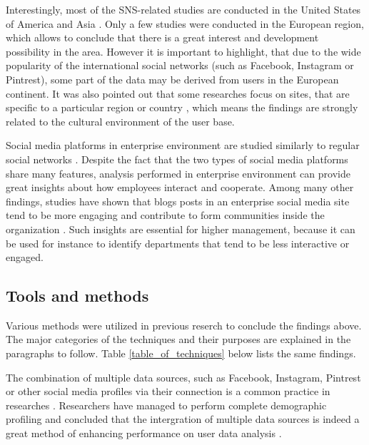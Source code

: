 Interestingly, most of the SNS-related studies are conducted in the United States of America and Asia \cite{waheed2017investigation}. Only a few studies were conducted in the European region, which allows to conclude that there is a great interest and development possibility in the area. However it is important to highlight, that due to the wide popularity of the international social networks (such as Facebook, Instagram or Pintrest), some part of the data may be derived from users in the European continent. It was also pointed out that some researches focus on sites, that are specific to a particular region or country \cite{waheed2017investigation}, which means the findings are strongly related to the cultural environment of the user base.    

Social media platforms in enterprise environment are studied similarly to regular social networks \cite{guy2016whatsyourorganizationlike}. Despite the fact that the two types of social media platforms share many features, analysis performed in enterprise environment can provide great insights about how employees interact and cooperate. Among many other findings, studies have shown that blogs posts in an enterprise social media site tend to be more engaging and contribute to form communities inside the organization \cite{guy2016whatsyourorganizationlike}. Such insights are essential for higher management, because it can be used for instance to identify departments that tend to be less interactive or engaged.  

\subsection{Tools and methods}
Various methods were utilized in previous reserch to conclude the findings above. The major categories of the techniques and their purposes are explained in the paragraphs to follow. Table \ref{table_of_techniques} below lists the same findings.

   The combination of multiple data sources, such as Facebook, Instagram, Pintrest or other social media profiles via their connection is a common practice in researches \cite{farseev2015harvestingmultiplesources, ottoni2013ladies}. Researchers have managed to perform complete demographic profiling and concluded that the intergration of multiple data sources is indeed a great method of enhancing performance on user data analysis \cite{farseev2015harvestingmultiplesources}. 
  
